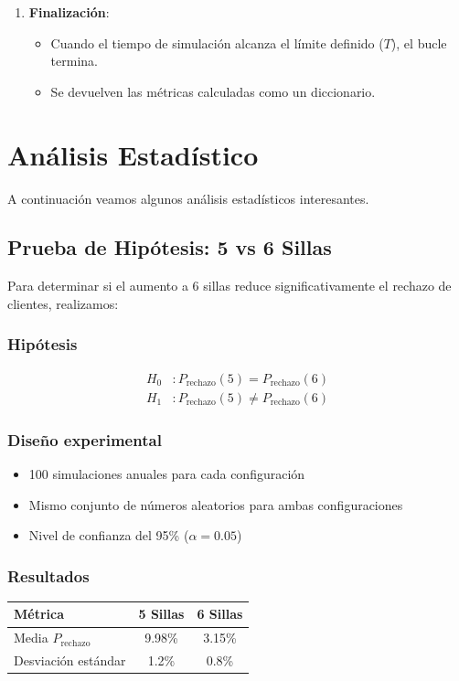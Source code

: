 \documentclass{article}
\begin{document}
\begin{enumerate}
    \item \textbf{Finalización}:
    \begin{itemize}
        \item Cuando el tiempo de simulación alcanza el límite definido (\(T\)), el bucle termina.
        \item Se devuelven las métricas calculadas como un diccionario.
    \end{itemize}
\end{enumerate}

\section{Análisis Estadístico}

A continuación veamos algunos análisis estadísticos interesantes.

\subsection{Prueba de Hipótesis: 5 vs 6 Sillas}
Para determinar si el aumento a 6 sillas reduce significativamente el rechazo de clientes, realizamos:

\subsubsection{Hipótesis}
\begin{align*}
    H_0&: P_{\text{rechazo}}(5) = P_{\text{rechazo}}(6) \\
    H_1&: P_{\text{rechazo}}(5) \ne P_{\text{rechazo}}(6)
\end{align*}

\subsubsection{Diseño experimental}
\begin{itemize}
    \item 100 simulaciones anuales para cada configuración
    \item Mismo conjunto de números aleatorios para ambas configuraciones
    \item Nivel de confianza del 95\% ($\alpha = 0.05$)
\end{itemize}

\subsubsection{Resultados}
\begin{table}[H]
    \centering
    \begin{tabular}{lcc}
        \toprule
        Métrica & 5 Sillas & 6 Sillas \\
        \midrule
        Media $P_{\text{rechazo}}$ & 9.98\% & 3.15\% \\
        Desviación estándar & 1.2\% & 0.8\% \\
        \bottomrule
    \end{tabular}
\end{table}
\end{document}
